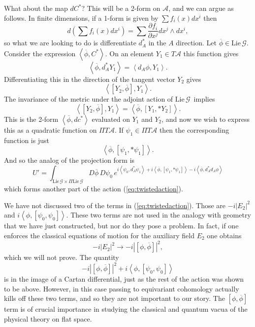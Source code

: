 \documentclass[twoside]{amsart}
\renewcommand{\eqref}[1]{(\ref{eq:#1})}
\newcommand{\enm}[1]{\ensuremath{#1}}
\renewcommand{\aa}{\enm{\mathcal{A}}}
\renewcommand{\gg}{\enm{\mathcal{G}}}
\newcommand{\ip}[2]{\enm{\left<#1,#2\right>}}
\renewcommand{\bar}[1]{\overline{#1}}
\newcommand{\lieg}{\enm{\mathrm{Lie}\,\gg}}
\begin{document}
What about the map \( dC^* \)?   This will be a 2-form on \aa, and we
can argue as follows.  In finite dimensions, if a 1-form is given by
\( \sum f_i(x)dx^i \) then
\[ d\left(\sum f_i(x)dx^i\right) = \sum \frac{\partial f_i}{\partial
x^j}dx^j\wedge dx^i, \]
so what we are looking to do is differentiate \( d_A^* \) in the \( A
\) direction. Let \( \bar{\phi}\in\lieg. \) Consider the expression
\(\ip{\bar{\phi}}{C^*} \).  On an element \(Y_1\in T\aa\) this
function gives
\[ \ip{\bar{\phi}}{d_A^* Y_1} = \ip{d_A\phi}{Y_1}. \]
Differentiating this in the direction of the tangent vector \(Y_2\)
gives
\[ \ip{[Y_2,\bar{\phi}]}{Y_1}. \]
The invariance of the metric under the adjoint action of \lieg\
implies
\[ \ip{[Y_2,\bar{\phi}]}{Y_1} = \ip{\bar{\phi}}{[Y_1,*Y_2]}. \]
This is the 2-form \ip{\bar{\phi}}{dc^*} evaluated on \(Y_1\) and
\(Y_2\), and now we wish to express this as a quadratic function on
\(\Pi T\aa\).  If \(\psi_1\in\Pi T\aa\) then the corresponding
function is just
\begin{equation}
   \label{eq:2formasfunction}
   \ip{\bar{\phi}}{[\psi_1,*\psi_1]}.
\end{equation}
And so the analog of the projection form is
\begin{equation}
   \label{eq:ppartofpathintegral}
   U' = \int_{\lieg\times\Pi\lieg}D\bar{\phi}\,D\psi_0\,
    e^{i\ip{\psi_0}{d_A^*\psi_1} + i\ip{\bar{\phi}}{[\psi_1,*\psi_1]}
-
    i\ip{\bar{\phi}}{d_A^*d_A\phi}}
\end{equation}
which forms another part of the action \eqref{twistedaction}.

We have not discussed two of the terms in \eqref{twistedaction}.
Those are \( -i|E_{2}|^{2} \) and \( i\ip{\phi}{[\psi_{0},\psi_{0}]}.
\) These two terms are not used in the analogy with geometry that we
have just constructed, but nor do they pose a problem.  In fact, if one
enforces the classical equations of motion for the auxiliary field \(
E_{2} \) one obtains \[ -i|E_{2}|^{2}\to -i|[\phi,\bar{\phi}]|^{2}, \]
which we will not prove.  The quantity \[ -i|[\phi,\bar{\phi}]|^{2} +
i\ip{\phi}{[\psi_{0},\psi_{0}]}\] is in the image of a Cartan
differential, just as the rest of the action was shown to be above.
However, in this case passing to equivariant cohomology actually kills
off these two terms, and so they are not important to our story.  The
\( [\phi,\bar{\phi}] \) term is of crucial importance in studying the
classical and quantum vacua of the physical theory on flat
space.

\end{document}
